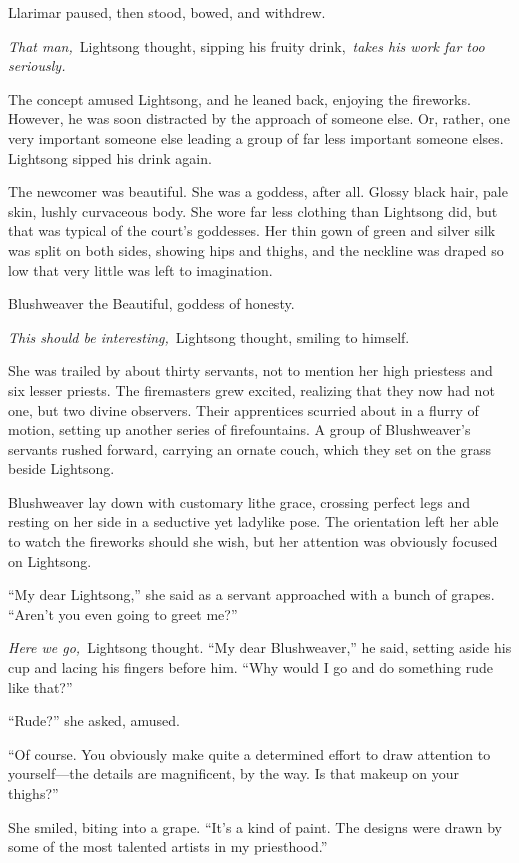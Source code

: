 Llarimar paused, then stood, bowed, and withdrew.

\textit{That man,}~Lightsong thought, sipping his fruity drink,~\textit{takes his work far too seriously.}

The concept amused Lightsong, and he leaned back, enjoying the fireworks. However, he was soon distracted by the approach of someone else. Or, rather, one very important someone else leading a group of far less important someone elses. Lightsong sipped his drink again.

The newcomer was beautiful. She was a goddess, after all. Glossy black hair, pale skin, lushly curvaceous body. She wore far less clothing than Lightsong did, but that was typical of the court’s goddesses. Her thin gown of green and silver silk was split on both sides, showing hips and thighs, and the neckline was draped so low that very little was left to imagination.

Blushweaver the Beautiful, goddess of honesty.

\textit{This should be interesting,}~Lightsong thought, smiling to himself.

She was trailed by about thirty servants, not to mention her high priestess and six lesser priests. The firemasters grew excited, realizing that they now had not one, but two divine observers. Their apprentices scurried about in a flurry of motion, setting up another series of firefountains. A group of Blushweaver’s servants rushed forward, carrying an ornate couch, which they set on the grass beside Lightsong.

Blushweaver lay down with customary lithe grace, crossing perfect legs and resting on her side in a seductive yet ladylike pose. The orientation left her able to watch the fireworks should she wish, but her attention was obviously focused on Lightsong.

“My dear Lightsong,” she said as a servant approached with a bunch of grapes. “Aren’t you even going to greet me?”

\textit{Here we go,}~Lightsong thought. “My dear Blushweaver,” he said, setting aside his cup and lacing his fingers before him. “Why would I go and do something rude like that?”

“Rude?” she asked, amused.

“Of course. You obviously make quite a determined effort to draw attention to yourself—the details are magnificent, by the way. Is that makeup on your thighs?”

She smiled, biting into a grape. “It’s a kind of paint. The designs were drawn by some of the most talented artists in my priesthood.”

